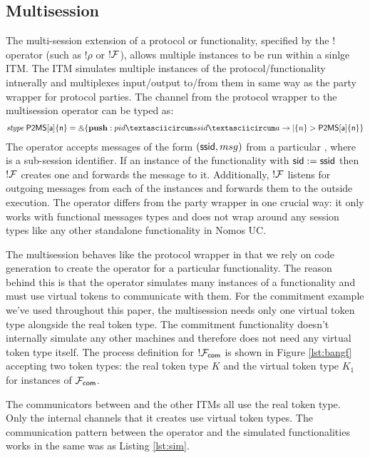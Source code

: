 \subsection{Multisession}
The multi-session extension of a protocol or functionality, specified by the $!$ operator (such as $!\rho$ or $!\mathcal{F}$), allows multiple instances to be run within a sinlge ITM.
The ITM simulates multiple instances of the protocol/functionality intnerally and multiplexes input/output to/from them in same way as the party wrapper for protocol parties.
The channel from the protocol wrapper to the multisession operator can be typed as:
\begin{gather}
\mi{stype} \; \m{{P2MS}[a]\{n\}} = \echoice{\mb{push}: pid \textasciicircum ssid \textasciicircum a \arrow |\{n\}> \m{P2MS[a]\{n\}}}
\end{gather}
The operator accepts messages of the form $({\mathsf {ssid}}, msg)$ from a particular , where  is a sub-session identifier.
If an instance of the functionality with ${\mathsf {sid}} := {\mathsf {ssid}}$ then $!\mathcal{F}$ creates one and forwards the message to it.
Additionally, $!\mathcal{F}$ listens for outgoing messages from each of the instances and forwards them to the outside execution.
The operator differs from the party wrapper in one crucial way: it only works with functional messages types and does not wrap around any session types like any other standalone functionality in Nomos UC.

The multisession behaves like the protocol wrapper in that we rely on code generation to create the operator for a particular functionality. 
The reason behind this is that the operator simulates many instances of a functionality and must use virtual tokens to communicate with them. 
For the commitment example we've used throughout this paper, the multisession needs only one virtual token type alongside the real token type.
The commitment functionality doesn't internally simulate any other machines and therefore does not need any virtual token type itself. 
The process definition for $!\mathcal{F}_{{\mathsf {com}}}$ is shown in Figure \ref{lst:bangf} accepting two token types: the real token type $K$ and the virtual token type $K_1$ for instances of $\mathcal{F}_{{\mathsf {com}}}$.

The communicators between \bangf and the other ITMs all use the real token type.
Only the internal channels that it creates use virtual token types.
The communication pattern between the operator and the simulated functionalities works in the same was as Listing \ref{lst:sim}.

